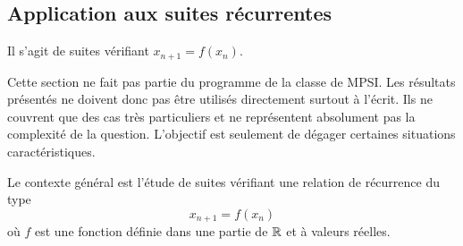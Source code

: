 \subsection{Application aux suites récurrentes}
Il s'agit de suites vérifiant $x_{n+1} = f(x_n)$.

Cette section ne fait pas partie du programme de la classe de MPSI. Les résultats présentés ne doivent donc pas être utilisés directement surtout à l'écrit. Ils ne couvrent que des cas très particuliers et ne représentent absolument pas la complexité de la question. L'objectif est seulement de dégager certaines situations caractéristiques.

Le contexte général est l'étude de suites vérifiant une relation de récurrence du type
\begin{displaymath}
 x_{n+1}=f(x_n)
\end{displaymath}
où $f$ est une fonction définie dans une partie de $\mathbb{R}$ et à valeurs réelles.
